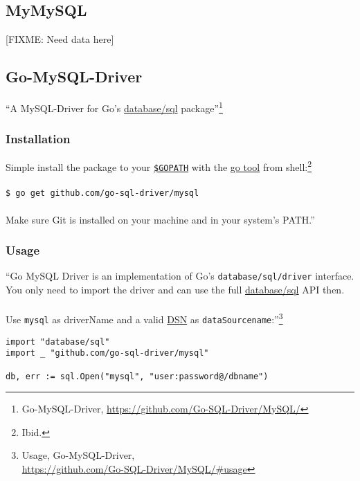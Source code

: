 \documentclass[12pt,letterpaper,dvips]{article}
\newcommand{\FIXME}[1]{\textsf{[FIXME: #1]}}
\begin{document}
\subsection{MyMySQL}
\FIXME{Need data here}


\newpage
\subsection{Go-MySQL-Driver}
``A MySQL-Driver for Go's
\href{http://golang.org/pkg/database/sql}{database/sql}
package''\footnote{Go-MySQL-Driver, \href{https://github.com/Go-SQL-Driver/MySQL/}{https://github.com/Go-SQL-Driver/MySQL/}}

\subsubsection{Installation}
Simple install the package to your
\texttt{\href{http://code.google.com/p/go-wiki/wiki/GOPATH}{\$GOPATH}}
with the \href{http://golang.org/cmd/go/}{go tool} from
shell:\footnote{Ibid.}\\
\\
\texttt{\$ go get github.com/go-sql-driver/mysql}\\
\\
\noindent Make sure Git is installed on your machine and in your
system's PATH.''

\subsubsection{Usage}
``Go MySQL Driver is an implementation of Go's
\texttt{database/sql/driver} interface.  You only need to
import the driver and can use the full
\href{http://golang.org/pkg/database/sql}{database/sql}
API then.\\
\\
Use \texttt{mysql} as driverName and a valid
\href{https://github.com/Go-SQL-Driver/MySQL/\#dsn-data-source-name}{DSN}
as \texttt{dataSourcename}:''\footnote{Usage, Go-MySQL-Driver,\\
\href{https://github.com/Go-SQL-Driver/MySQL/\#usage}{https://github.com/Go-SQL-Driver/MySQL/\#usage}}
\begin{verbatim}
import "database/sql"
import _ "github.com/go-sql-driver/mysql"

db, err := sql.Open("mysql", "user:password@/dbname")
\end{verbatim}
\end{document}
